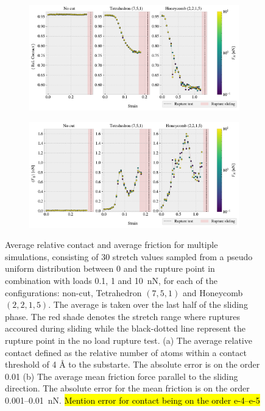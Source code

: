 \begin{figure}[H]
  \centering
  \begin{subfigure}[t]{\textwidth}
      \centering
      \includegraphics[width=\textwidth]{figures/baseline/multi_stretch_area_compare.pdf}
      \caption{}
      \label{fig:fig:multi_stretch_contact}
  \end{subfigure}
  \hfill
  \begin{subfigure}[t]{\textwidth}
      \centering
      \includegraphics[width=\textwidth]{figures/baseline/multi_stretch_mean_compare.pdf}
      \caption{}
      \label{fig:multi_stretch_mean_fric}
  \end{subfigure}
  \hfill
     \caption{Average relative contact and average friction for multiple simulations, consisting of 30 stretch values sampled from a pseudo uniform distribution between 0 and the rupture point in combination with loads 0.1, 1 and \SI{10}{nN}, for each of the configurations: non-cut, Tetrahedron $(7,5,1)$ and Honeycomb $(2,2,1,5)$. The average is taken over the last half of the sliding phase. The red shade denotes the stretch range where ruptures accoured during sliding while the black-dotted line represent the rupture point in the no load rupture test. (a) The average relative contact defined as the relative number of atoms within a contact threshold of 4 Å to the substarte. The absolute error is on the order 0.01 (b) The average mean friction force parallel to the sliding direction. The absolute error for the mean friction is on the order 0.001--\SI{0.01}{nN}. \hl{Mention error for contact being on the order e-4--e-5}}
     \label{fig:multi_stretch}
\end{figure}

